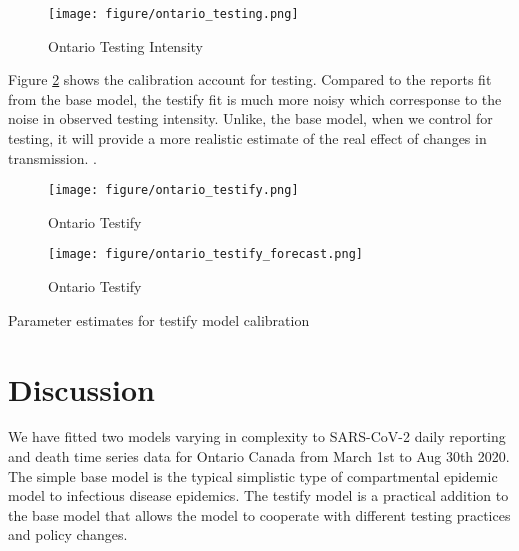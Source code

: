 \documentclass[12pt]{article}\usepackage[]{graphicx}\usepackage[]{color}
\begin{document}
\begin{figure}[ht!]
\color{fgcolor}
\texttt{[image: figure/ontario\_testing.png]}


\caption{Ontario Testing Intensity}
\label{fig:Ont_testing}
\end{figure}

\FloatBarrier

Figure \ref{fig:Ont_calibration_testify} shows the calibration account for testing. 
Compared to the reports fit from the base model, the testify fit is much more noisy which corresponse to the noise in observed testing intensity. 
Unlike, the base model, when we control for testing, it will provide a more realistic estimate of the real effect of changes in transmission.
.

\begin{figure}[ht!]
\color{fgcolor}
\texttt{[image: figure/ontario\_testify.png]}

\caption{Ontario Testify}
\label{fig:Ont_calibration_testify}
\end{figure}

\begin{figure}[ht!]
\color{fgcolor}
\texttt{[image: figure/ontario\_testify\_forecast.png]}

\caption{Ontario Testify}
\label{fig:Ont_calibration_testify_forecast}
\end{figure}


\begin{table}
\centering

\caption{Parameter estimates for testify model calibration}
\label{table:testify}

\end{table}

\FloatBarrier

\section{Discussion}

We have fitted two models varying in complexity to SARS-CoV-2 daily reporting and death time series data for Ontario Canada from March 1st to Aug 30th 2020. 
The simple base model is the typical simplistic type of compartmental epidemic model to infectious disease epidemics. 
The testify model is a practical addition to the base model that allows the model to cooperate with different testing practices and policy changes.
\end{document}
